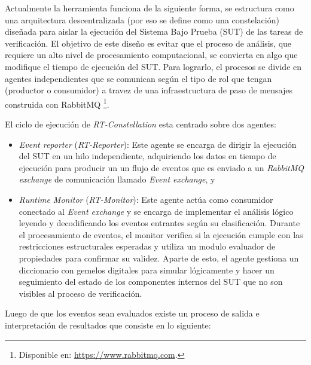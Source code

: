 \documentclass[12pt, letterpaper]{article}
\begin{document}
 Actualmente la herramienta funciona de la siguiente forma, se estructura como una arquitectura descentralizada (por eso se define como una constelación) diseñada para aislar la ejecución del Sistema Bajo Prueba (SUT) de las tareas de verificación. El objetivo de este diseño es evitar que el proceso de análisis, que requiere un alto nivel de procesamiento computacional, se convierta en algo que modifique el tiempo de ejecución del SUT. Para lograrlo, el procesos se divide en agentes independientes que se comunican según el tipo de rol que tengan (productor o consumidor) a travez de una infraestructura de paso de mensajes construida con RabbitMQ \footnote{Disponible en: \url{https://www.rabbitmq.com}.}. 

 El ciclo de ejecución de \emph{RT-Constellation} esta centrado sobre dos agentes:
 \begin{itemize}
  \item \emph{Event reporter} (\emph{RT-Reporter}):
    Este agente se encarga de dirigir la ejecución del SUT en un hilo independiente, adquiriendo los datos en tiempo de ejecución para producir un un flujo de eventos que es enviado a un \emph{RabbitMQ exchange} de comunicación llamado \emph{Event exchange}, y
  \item \emph{Runtime Monitor} (\emph{RT-Monitor}):
    Este agente actúa como consumidor conectado al \emph{Event exchange} y se encarga de implementar el análisis lógico leyendo y decodificando los eventos entrantes según su clasificación. Durante el procesamiento de eventos, el monitor verifica si la ejecución cumple con las restricciones estructurales esperadas y utiliza un modulo evaluador de propiedades para confirmar su validez. Aparte de esto, el agente gestiona un diccionario con gemelos digitales para simular lógicamente y hacer un seguimiento del estado de los componentes internos del SUT que no son visibles al proceso de verificación.
 \end{itemize}
 Luego de que los eventos sean evaluados existe un proceso de salida e interpretación de resultados que consiste en lo siguiente:
\end{document}
